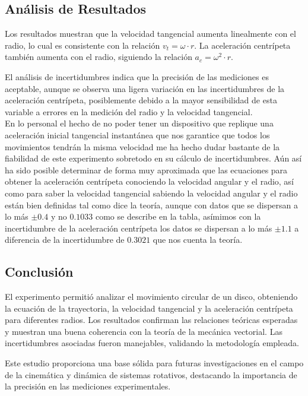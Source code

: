 \documentclass{article}
\begin{document}
\subsection{Análisis de Resultados}
Los resultados muestran que la velocidad tangencial aumenta linealmente con el radio, lo cual es consistente con la relación \( v_t = \omega \cdot r \). La aceleración centrípeta también aumenta con el radio, siguiendo la relación \( a_c = \omega^2 \cdot r \).

El análisis de incertidumbres indica que la precisión de las mediciones es aceptable, aunque se observa una ligera variación en las incertidumbres de la aceleración centrípeta, posiblemente debido a la mayor sensibilidad de esta variable a errores en la medición del radio y la velocidad tangencial.\\
En lo personal el hecho de no poder tener un dispositivo que replique una aceleración inicial tangencial instantánea que nos garantice que todos los movimientos tendrán la misma velocidad me ha hecho dudar bastante de la fiabilidad de este experimento sobretodo en su cálculo de incertidumbres. Aún así ha sido posible determinar de forma muy aproximada que las ecuaciones para obtener la aceleración centrípeta conociendo la velocidad angular y el radio, así como para saber la velocidad tangencial sabiendo la velocidad angular y el radio están bien definidas tal como dice la teoría, aunque con datos que se dispersan a lo más $\pm 0.4$ y no $0.1033$ como se describe en la tabla, asímimos con la incertidumbre de la aceleración centrípeta los datos se dispersan a lo más $\pm 1.1$ a diferencia de la incertidumbre de $0.3021$ que nos cuenta la teoría.

\subsection{Conclusión}
El experimento permitió analizar el movimiento circular de un disco, obteniendo la ecuación de la trayectoria, la velocidad tangencial y la aceleración centrípeta para diferentes radios. Los resultados confirman las relaciones teóricas esperadas y muestran una buena coherencia con la teoría de la mecánica vectorial. Las incertidumbres asociadas fueron manejables, validando la metodología empleada.

Este estudio proporciona una base sólida para futuras investigaciones en el campo de la cinemática y dinámica de sistemas rotativos, destacando la importancia de la precisión en las mediciones experimentales.
\end{document}
